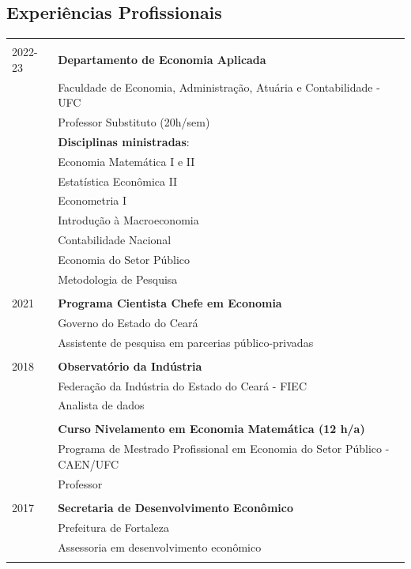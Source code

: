\documentclass[a4paper,10pt]{article}
\begin{document}
	\center\subsection*{Experiências Profissionais}
	\begin{flushleft}
	\begin{tabular}{>{\raggedleft}p{2cm}|p{13cm}}
		\multicolumn{2}{c}{} \\

		\textsc{2022-23} & \textbf{Departamento de Economia Aplicada} \\
		& Faculdade de Economia, Administração, Atuária e Contabilidade - UFC \\
		& Professor Substituto (20h/sem)  \vspace{0.2cm} \\
		& {\small \textbf{Disciplinas ministradas}:}  \\
		& {\small Economia Matemática I e II} \\
		& {\small Estatística Econômica II} \\
		& {\small Econometria I} \\
		& {\small Introdução à Macroeconomia} \\
		& {\small Contabilidade Nacional} \\
		& {\small Economia do Setor Público} \\
		& {\small Metodologia de Pesquisa} \\
		\multicolumn{2}{c}{} \\

		\textsc{2021} & \textbf{Programa Cientista Chefe em Economia} \\
		& Governo do Estado do Ceará \\
		& Assistente de pesquisa em parcerias público-privadas\\
		\multicolumn{2}{c}{} \\

		\textsc{2018} & \textbf{Observatório da Indústria} \\
		& Federação da Indústria do Estado do Ceará - FIEC \\
		& Analista de dados \\
		\multicolumn{2}{c}{} \\

		2017 &  \textbf{Curso Nivelamento em Economia Matemática (12 h/a)} \\
		& Programa de Mestrado Profissional em Economia do Setor Público - CAEN/UFC\\
		& Professor \\
		\multicolumn{2}{c}{} \\

		\textsc{2017} & \textbf{Secretaria de Desenvolvimento Econômico} \\
		& Prefeitura de Fortaleza \\
		& Assessoria em desenvolvimento econômico\\
		\multicolumn{2}{c}{} \\

	\end{tabular}
	\end{flushleft}
\end{document}
